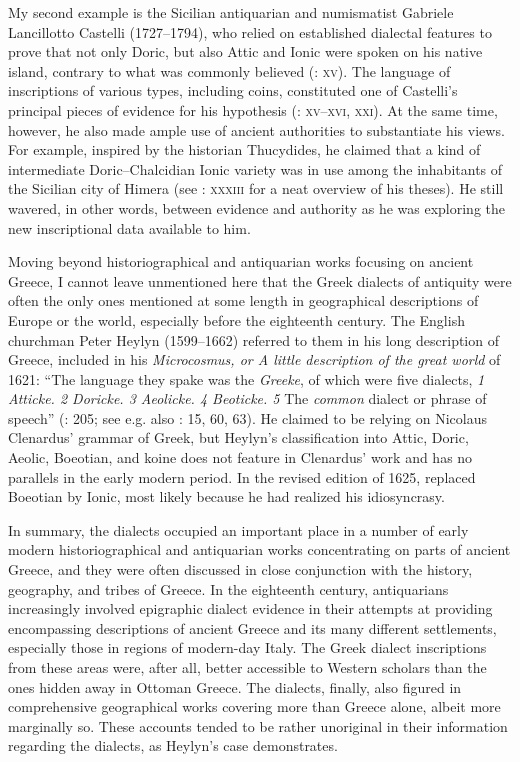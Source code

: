 My second example is the Sicilian antiquarian and numismatist Gabriele Lancillotto Castelli (1727–1794), who relied on established dialectal features to prove that not only Doric, but also Attic and Ionic were spoken on his native island, contrary to what was commonly believed (\citealt{Castelli1769}: \textsc{xv}). The language of inscriptions of various types, including coins, constituted one of Castelli’s principal pieces of evidence for his hypothesis (\citealt{Castelli1769}: \textsc{xv–xvi,} \textsc{xxi}). At the same time, however, he also made ample use of ancient authorities to substantiate his views. For example, inspired by the historian Thucydides, he claimed that a kind of intermediate Doric–Chalcidian Ionic variety was in use among the inhabitants of the Sicilian city of Himera (see \citealt{Castelli1769}: \textsc{xxxiii} for a neat overview of his theses). He still wavered, in other words, between evidence and authority as he was exploring the new inscriptional data available to him.

Moving beyond historiographical and antiquarian works focusing on ancient Greece, I cannot leave unmentioned here that the Greek dialects of antiquity were often the only ones mentioned at some length in geographical descriptions of Europe or the world, especially before the eighteenth century. The English churchman Peter Heylyn (1599–1662) referred to them in his long description of Greece, included in his \textit{Microcosmus, or A little description of the great world} of 1621: “The language they spake was the \textit{Greeke}, of which were five dialects, \textit{1 Atticke. 2 Doricke. 3 Aeolicke. 4 Beoticke. 5} The \textit{common} dialect or phrase of speech” (\citealt{Heylyn1621}: 205; see e.g. also \citealt{Speed1676}: 15, 60, 63). He claimed to be relying on Nicolaus Clenardus’ grammar of Greek, but Heylyn’s classification into Attic, Doric, Aeolic, Boeotian, and koine does not feature in Clenardus’ work and has no parallels in the early modern period. In the revised edition of 1625, \citet[375]{Heylyn1625} replaced Boeotian by Ionic, most likely because he had realized his idiosyncrasy.

In summary, the dialects occupied an important place in a number of early modern historiographical and antiquarian works concentrating on parts of ancient Greece, and they were often discussed in close conjunction with the history, geography, and tribes of Greece. In the eighteenth century, antiquarians increasingly involved epigraphic dialect evidence in their attempts at providing encompassing descriptions of ancient Greece and its many different settlements, especially those in regions of modern-day Italy. The Greek dialect inscriptions from these areas were, after all, better accessible to Western scholars than the ones hidden away in Ottoman Greece. The dialects, finally, also figured in comprehensive geographical works covering more than Greece alone, albeit more marginally so. These accounts tended to be rather unoriginal in their information regarding the dialects, as Heylyn’s case demonstrates.

